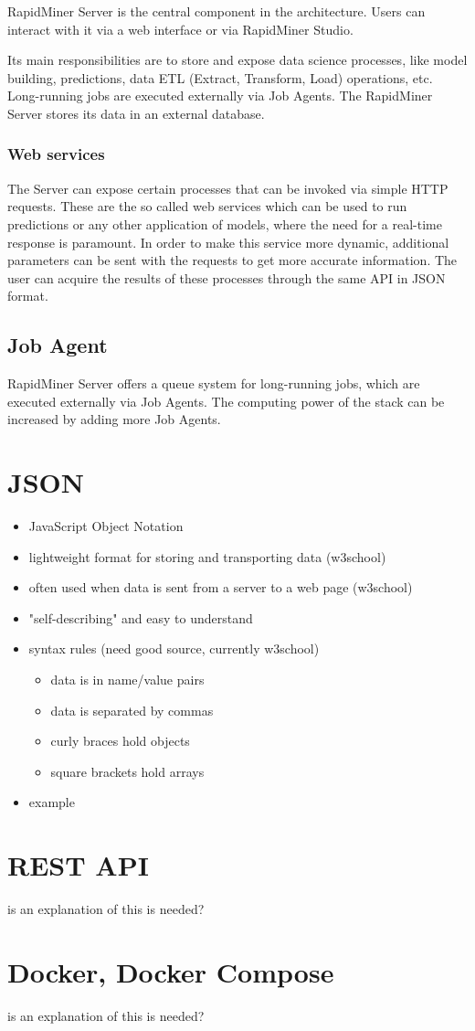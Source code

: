 RapidMiner Server is the central component in the architecture. Users can interact with it via a web interface or via RapidMiner Studio.

Its main responsibilities are to store and expose data science processes, like model building, predictions, data ETL (Extract, Transform, Load) operations, etc. Long-running jobs are executed externally via Job Agents. The RapidMiner Server stores its data in an external database.

\subsubsection{Web services}
The Server can expose certain processes that can be invoked via simple HTTP requests. These are the so called web services which can be used to run predictions or any other application of models, where the need for a real-time response is paramount. In order to make this service more dynamic, additional parameters can be sent with the requests to get more accurate information. The user can acquire the results of these processes through the same API in JSON format.

\subsection{Job Agent}

RapidMiner Server offers a queue system for long-running jobs, which are executed externally via Job Agents. The computing power of the stack can be increased by adding more Job Agents.

\section{JSON}

\begin{itemize}
	\item JavaScript Object Notation
	\item lightweight format for storing and transporting data (w3school)
	\item often used when data is sent from a server to a web page (w3school)
	\item "self-describing" and easy to understand
	\item syntax rules (need good source, currently w3school)
	\begin{itemize}
		\item data is in name/value pairs
		\item data is separated by commas
		\item curly braces hold objects
		\item square brackets hold arrays
	\end{itemize}
	\item example
\end{itemize}


\section{REST API}

is an explanation of this is needed?

\section{Docker, Docker Compose}

is an explanation of this is needed?

